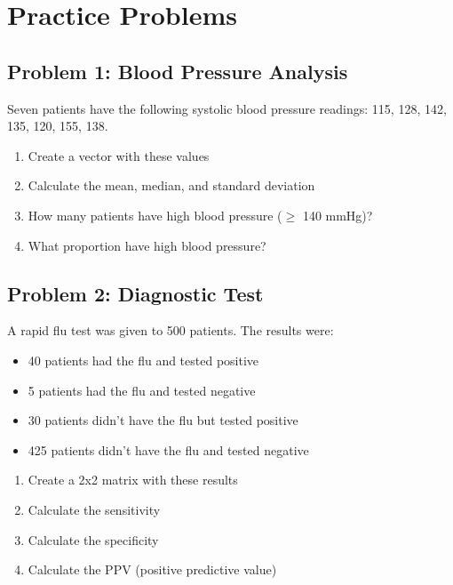 \documentclass[11pt]{article}
\begin{document}
\section{Practice Problems}

\subsection{Problem 1: Blood Pressure Analysis}

Seven patients have the following systolic blood pressure readings: 115, 128, 142, 135, 120, 155, 138.

\begin{enumerate}[label=\alph*)]
\item Create a vector with these values
\item Calculate the mean, median, and standard deviation
\item How many patients have high blood pressure ($\geq$ 140 mmHg)?
\item What proportion have high blood pressure?
\end{enumerate}

\vspace{3cm}

\subsection{Problem 2: Diagnostic Test}

A rapid flu test was given to 500 patients. The results were:
\begin{itemize}
\item 40 patients had the flu and tested positive
\item 5 patients had the flu and tested negative
\item 30 patients didn't have the flu but tested positive
\item 425 patients didn't have the flu and tested negative
\end{itemize}

\begin{enumerate}[label=\alph*)]
\item Create a 2x2 matrix with these results
\item Calculate the sensitivity
\item Calculate the specificity
\item Calculate the PPV (positive predictive value)
\end{enumerate}

\vspace{3cm}
\end{document}
